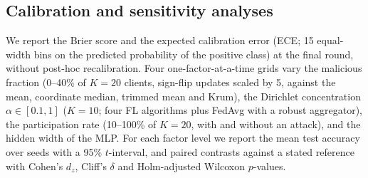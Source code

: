 \documentclass[conference]{IEEEtran}
\begin{document}
\subsection{Calibration and sensitivity analyses}
We report the Brier score and the expected calibration error (ECE; 15 equal-width bins on the predicted probability of the positive class) at the final round, without post-hoc recalibration. Four one-factor-at-a-time grids vary the malicious fraction (0--40\% of $K=20$ clients, sign-flip updates scaled by 5, against the mean, coordinate median, trimmed mean and Krum), the Dirichlet concentration $\alpha\in[0.1,1]$ ($K=10$; four FL algorithms plus FedAvg with a robust aggregator), the participation rate (10--100\% of $K=20$, with and without an attack), and the hidden width of the MLP. For each factor level we report the mean test accuracy over seeds with a 95\% $t$-interval, and paired contrasts against a stated reference with Cohen's $d_z$, Cliff's $\delta$ and Holm-adjusted Wilcoxon $p$-values.
\end{document}
